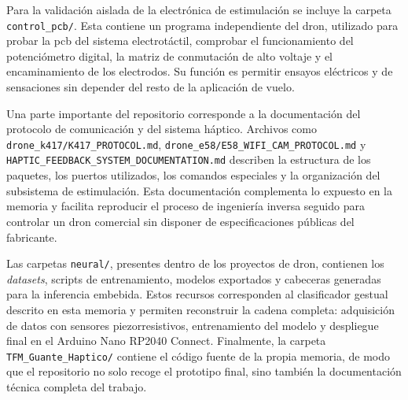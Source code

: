 \documentclass[12pt]{article}
\begin{document}
\begin{appendices}
Para la validación aislada de la electrónica de estimulación se incluye la carpeta \texttt{control\_pcb/}. Esta contiene un programa independiente del dron, utilizado para probar la \gls{pcb} del sistema electrotáctil, comprobar el funcionamiento del potenciómetro digital, la matriz de conmutación de alto voltaje y el encaminamiento de los electrodos. Su función es permitir ensayos eléctricos y de sensaciones sin depender del resto de la aplicación de vuelo.

Una parte importante del repositorio corresponde a la documentación del protocolo de comunicación y del sistema háptico. Archivos como \texttt{drone\_k417/K417\_PROTOCOL.md}, \texttt{drone\_e58/E58\_WIFI\_CAM\_PROTOCOL.md} y \texttt{HAPTIC\_FEEDBACK\_SYSTEM\_DOCUMENTATION.md} describen la estructura de los paquetes, los puertos utilizados, los comandos especiales y la organización del subsistema de estimulación. Esta documentación complementa lo expuesto en la memoria y facilita reproducir el proceso de ingeniería inversa seguido para controlar un dron comercial sin disponer de especificaciones públicas del fabricante.

Las carpetas \texttt{neural/}, presentes dentro de los proyectos de dron, contienen los \textit{datasets}, scripts de entrenamiento, modelos exportados y cabeceras generadas para la inferencia embebida. Estos recursos corresponden al clasificador gestual descrito en esta memoria y permiten reconstruir la cadena completa: adquisición de datos con sensores piezorresistivos, entrenamiento del modelo y despliegue final en el Arduino Nano RP2040 Connect. Finalmente, la carpeta \texttt{TFM\_Guante\_Haptico/} contiene el código fuente de la propia memoria, de modo que el repositorio no solo recoge el prototipo final, sino también la documentación técnica completa del trabajo.
\end{appendices}
\end{document}
